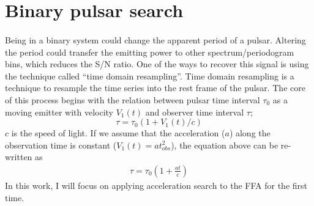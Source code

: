 \documentclass[thesis_msc.tex]{subfiles}
\begin{document}
    \section{Binary pulsar search} \label{BS}
	\paragraph{} Being in a binary system could change the apparent period of a pulsar. Altering the period could transfer the emitting power to other spectrum/periodogram bins, which  reduces the S/N ratio. One of the ways to recover this signal is using the technique called ``time domain resampling''. Time domain resampling is a technique to resample the time series into the rest frame of the pulsar. The core of this process begins with the relation between pulsar time interval $\tau_0$  as a moving emitter with velocity $V_1(t)$ and observer time interval $\tau$; 
\begin{equation}
\tau=\tau_0(1+V_1(t)/c)
\end{equation}
$c$ is the speed of light. If we assume that the acceleration ($a$) along the observation time is constant ($V_1(t)=at_{obs}^2$), the equation above can be re-written as 
\begin{eqnarray}
\tau=\tau_0(1+\frac{at}{c})
\end{eqnarray} 
In this work, I will focus on applying acceleration search to the FFA for the first time.
\end{document}

